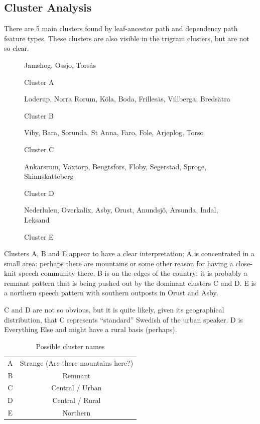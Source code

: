 \subsection{Cluster Analysis}

There are 5 main clusters found by leaf-ancestor path and dependency
path feature types. These clusters are also visible in the trigram
clusters, but are not so clear.

\begin{figure}
  Jamshog, Ossjo, Tors\.as
\label{cluster-a}
\caption{Cluster A}
\end{figure}

\begin{figure}
  Loderup, Norra Rorum, K\"ola, Boda, Frilles\.as, Villberga,
  Breds\"atra
\label{cluster-b}
\caption{Cluster B}
\end{figure}

\begin{figure}
  Viby, Bara, Sorunda, St Anna, Faro, Fole, Arjeplog, Torso
\label{cluster-c}
\caption{Cluster C}
\end{figure}

\begin{figure}
  Ankarsrum, V\"axtorp, Bengtsfors, Floby, Segerstad, Sproge,
  Skinnskatteberg
\label{cluster-d}
\caption{Cluster D}
\end{figure}

\begin{figure}
  Nederluleu, Overkalix, Asby, Orust, Anundsj\"o, Arsunda, Indal,
  Leksand
\label{cluster-e}
\caption{Cluster E}
\end{figure}

Clusters A, B and E appear to have a clear interpretation; A is
concentrated in a small area: perhaps there are mountains or some
other reason for having a close-knit speech community there. B is on
the edges of the country; it is probably a remnant pattern that is
being pushed out by the dominant clusters C and D. E is a
northern speech pattern with southern outposts in Orust and Asby.

C and D are not so obvious, but it is quite likely, given its
geographical distribution, that C represents
``standard'' Swedish of the urban speaker. D is Everything Else and
might have a rural basis (perhaps).

\begin{table}
  \begin{tabular}{cc}
    A & Strange (Are there mountains here?) \\
    B & Remnant \\
    C & Central / Urban \\
    D & Central / Rural \\
    E & Northern \\
    \end{tabular}
    \label{cluster-names}
    \caption{Possible cluster names}
\end{table}


